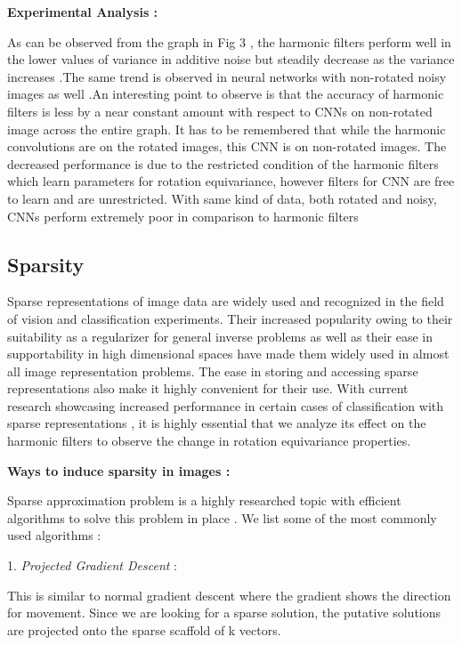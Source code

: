 \documentclass{article}
\begin{document}
\textbf{Experimental Analysis :}

As can be observed from the graph in Fig 3 , the harmonic filters perform well in the lower values of variance in additive noise but steadily decrease as the variance increases .The same trend is observed in neural networks with non-rotated noisy images as well .An interesting point to observe is that the accuracy of harmonic filters is less by a near constant amount with respect to CNNs on non-rotated image across the entire graph. It has to be remembered that while the harmonic convolutions are on the rotated images, this CNN is on non-rotated images. The decreased performance is due to the restricted condition of the harmonic filters which learn parameters for rotation equivariance, however filters for CNN are free to learn and are unrestricted.
With same kind of data, both rotated and noisy, CNNs perform extremely poor in comparison to harmonic filters

\subsection{Sparsity}

Sparse representations of image data are widely used and recognized in the field of vision and classification experiments. Their increased popularity owing to their suitability as a regularizer for general inverse problems as well as their ease in supportability in high dimensional spaces have made them widely used in almost all image representation problems. The ease in storing and accessing sparse representations also make it highly convenient for their use. With current research showcasing increased performance in certain cases of classification with sparse representations , it is highly essential that we analyze its effect on the harmonic filters to observe the change in rotation equivariance properties.

\textbf{Ways to induce sparsity in images :}

Sparse approximation problem is a highly researched topic with efficient algorithms to solve this problem in place . We list some of the most commonly used algorithms :

1.	\emph{Projected Gradient Descent} : 

This is similar to normal gradient descent where the gradient shows the direction for movement. Since we are looking for a sparse solution, the putative solutions are projected onto the sparse scaffold of k vectors.
\end{document}

